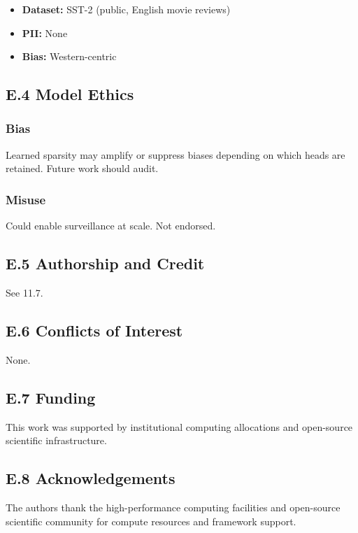 \begin{itemize}
\item \textbf{Dataset:} SST-2 (public, English movie reviews)
\item \textbf{PII:} None
\item \textbf{Bias:} Western-centric

\end{itemize}
\subsection{E.4 Model Ethics}

\subsubsection{Bias}

Learned sparsity may amplify or suppress biases depending on which heads 
are retained. Future work should audit.

\subsubsection{Misuse}

Could enable surveillance at scale. Not endorsed.

\subsection{E.5 Authorship and Credit}

See  11.7.

\subsection{E.6 Conflicts of Interest}

None.

\subsection{E.7 Funding}

This work was supported by institutional computing allocations and open-source scientific infrastructure.

\subsection{E.8 Acknowledgements}

The authors thank the high-performance computing facilities and open-source scientific community for compute resources and framework support.

